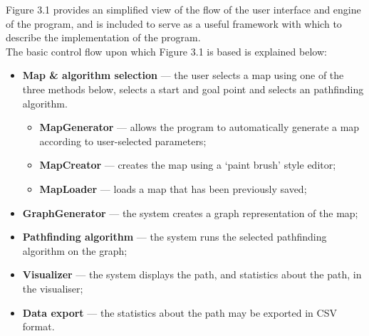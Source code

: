\documentclass[12pt,notitlepage]{report}
\begin{document}
\noindent
Figure 3.1 provides an simplified view of the flow of the user interface and engine of the program, and is included to serve as a useful framework with which to describe the implementation of the program.\\

\noindent
The basic control flow upon which Figure 3.1 is based is explained below:
\begin{itemize}
\item {\bfseries Map \& algorithm selection} --- the user selects a map using one of the three methods below, selects a start and goal point and selects an pathfinding algorithm.
  \begin{itemize}
  \item {\bfseries MapGenerator} --- allows the program to automatically generate a map according to user-selected parameters;
  \item {\bfseries MapCreator} --- creates the map using a `paint brush' style editor;
  \item {\bfseries MapLoader} --- loads a map that has been previously saved;
  \end{itemize}
\item {\bfseries GraphGenerator} --- the system creates a graph representation of the map;
\item {\bfseries Pathfinding algorithm} --- the system runs the selected pathfinding algorithm on the graph;
\item {\bfseries Visualizer} --- the system displays the path, and statistics about the path, in the visualiser;
\item {\bfseries Data export} --- the statistics about the path may be exported in CSV format.
\end{itemize}
\end{document}
